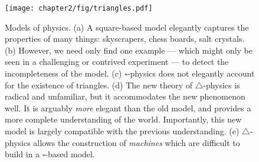 \begin{figure}[t!]
\centering
\texttt{[image: chapter2/fig/triangles.pdf]}
\caption[Models of physics.]{ 
Models of physics. (a) A square-based model elegantly captures the properties of many things:  skyscrapers, chess boards, salt crystals. (b) However, we need only find one example --- which might only be seen in a challenging or contrived experiment --- to detect the incompleteness of the model. (c) $\square$-physics does not elegantly account for the existence of triangles. (d) The new theory of $\bigtriangleup$-physics is radical and unfamiliar, but it accommodates the new phenomenon well. It is arguably \emph{more} elegant than the old model, and provides a more complete understanding of the world.  Importantly, this new model is largely compatible with the previous understanding.  
(e)  $\bigtriangleup$-physics allows the construction of \emph{machines} which are difficult to build in a $\square$-based model.
}
\label{fig:triangles}
\end{figure}

